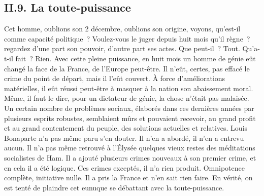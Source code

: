\documentclass[french,twoside]{book} %
\begin{document}
\subsection[{II.9. La toute-puissance}]{II.9. La toute-puissance}
\noindent Cet homme, oublions son 2 décembre, oublions son origine, voyons, qu’est-il comme capacité politique ? Voulez-vous le juger depuis huit mois qu’il règne ? regardez d’une part son pouvoir, d’autre part ses actes. Que peut-il ? Tout. Qu’a-t-il fait ? Rien. Avec cette pleine puissance, en huit mois un homme de génie eût changé la face de la France, de l’Europe peut-être. Il n’eût, certes, pas effacé le crime du point de départ, mais il l’eût couvert. À force d’améliorations matérielles, il eût réussi peut-être à masquer à la nation son abaissement moral. Même, il faut le dire, pour un dictateur de génie, la chose n’était pas malaisée. Un certain nombre de problèmes sociaux, élaborés dans ces dernières années par plusieurs esprits robustes, semblaient mûrs et pouvaient recevoir, au grand profit et au grand contentement du peuple, des solutions actuelles et relatives. Louis Bonaparte n’a pas même paru s’en douter. Il n’en a abordé, il n’en a entrevu aucun. Il n’a pas même retrouvé à l’Élysée quelques vieux restes des méditations socialistes de Ham. Il a ajouté plusieurs crimes nouveaux à son premier crime, et en cela il a été logique. Ces crimes exceptés, il n’a rien produit. Omnipotence complète, initiative nulle. Il a pris la France et n’en sait rien faire. En vérité, on est tenté de plaindre cet eunuque se débattant avec la toute-puissance.\par
\end{document}
